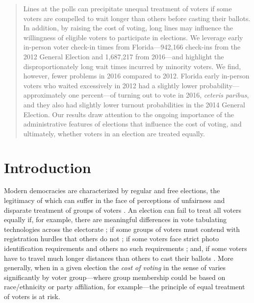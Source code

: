 \documentclass[12pt,titlepage]{article}
\begin{document}
\begin{abstract}
  \noindent 
  Lines at the polls can precipitate unequal treatment of voters if
  some voters are compelled to wait longer than others before casting
  their ballots. In addition, by raising the cost of voting, long
  lines may influence the willingness of eligible voters to
  participate in elections.  We leverage early in-person voter
  check-in times from Florida---942,166 check-ins from the 2012
  General Election and 1,687,217 from 2016---and highlight the
  disproportionately long wait times incurred by minority voters. We
  find, however, fewer problems in 2016 compared to 2012. Florida
  early in-person voters who waited excessively in 2012 had a slightly
  lower probability---approximately one percent---of turning out to
  vote in 2016, \emph{ceteris paribus}, and they also had slightly
  lower turnout probabilities in the 2014 General Election.  Our
  results draw attention to the ongoing importance of the
  administrative features of elections that influence the cost of
  voting, and ultimately, whether voters in an election are treated
  equally.
\end{abstract}



\newpage
\section*{Introduction}

Modern democracies are characterized by regular and free elections,
the legitimacy of which can suffer in the face of perceptions of
unfairness and disparate treatment of groups of voters
\citep{norris2014electoral}.  An election can fail to treat all voters
equally if, for example, there are meaningful differences in vote
tabulating technologies across the electorate
\citep[e.g.,][]{kimballkropf:tech}; if some groups of voters must
contend with registration hurdles that others do not
\cite[e.g.,][]{ansolhersh:registration}; if some voters face strict
photo identification requirements and others no such requirements
\citep[e.g.,][]{benteleetal:newjimcrow}; and, if some voters have to
travel much longer distances than others to cast their ballots
\citep[e.g.,][]{dyckgimpel:distance}.  More generally, when in a given
election the \emph{cost of voting} in the sense of
\cite{downs:econtheory} varies significantly by voter group---where
group membership could be based on race/ethnicity or party
affiliation, for example---the principle of equal treatment of voters
is at risk.
\end{document}
